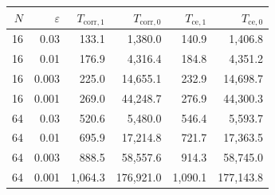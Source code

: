 \begin{tabular}{@{}rr rrrr@{}}
\toprule
$N$ & $\varepsilon$ & $T_{\mathrm{corr},1}$ & $T_{\mathrm{corr},0}$ & $T_{\mathrm{ce},1}$ & $T_{\mathrm{ce},0}$\\
\midrule
16 & 0.03 & 133.1 & 1,380.0 & 140.9 & 1,406.8\\
16 & 0.01 & 176.9 & 4,316.4 & 184.8 & 4,351.2\\
16 & 0.003 & 225.0 & 14,655.1 & 232.9 & 14,698.7\\
16 & 0.001 & 269.0 & 44,248.7 & 276.9 & 44,300.3\\
64 & 0.03 & 520.6 & 5,480.0 & 546.4 & 5,593.7\\
64 & 0.01 & 695.9 & 17,214.8 & 721.7 & 17,363.5\\
64 & 0.003 & 888.5 & 58,557.6 & 914.3 & 58,745.0\\
64 & 0.001 & 1,064.3 & 176,921.0 & 1,090.1 & 177,143.8\\
\bottomrule
\end{tabular}
